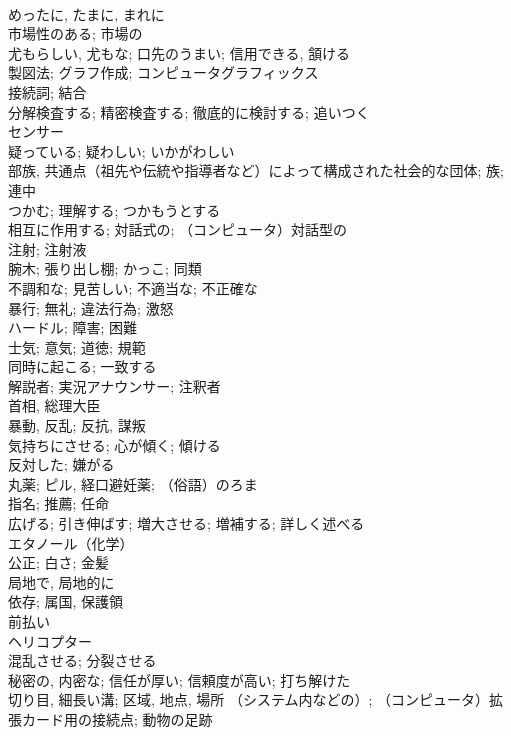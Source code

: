 \documentclass[8pt]{extreport}
\begin{document}
\begin{CJK}{UTF8}{min}
\\	めったに, たまに, まれに	
\\	市場性のある; 市場の	
\\	尤もらしい, 尤もな; 口先のうまい; 信用できる, 頷ける	
\\	製図法; グラフ作成; コンピュータグラフィックス	
\\	接続詞; 結合	
\\	分解検査する; 精密検査する; 徹底的に検討する; 追いつく	
\\	センサー	
\\	疑っている; 疑わしい; いかがわしい	
\\	部族, 共通点（祖先や伝統や指導者など）によって構成された社会的な団体; 族; 連中	
\\	つかむ; 理解する; つかもうとする	
\\	相互に作用する; 対話式の; （コンピュータ）対話型の	
\\	注射; 注射液	
\\	腕木; 張り出し棚; かっこ; 同類	
\\	不調和な; 見苦しい; 不適当な; 不正確な	
\\	暴行; 無礼; 違法行為; 激怒	
\\	ハードル; 障害; 困難	
\\	士気; 意気; 道徳; 規範	
\\	同時に起こる; 一致する	
\\	解説者; 実況アナウンサー; 注釈者
\\	首相, 総理大臣	
\\	暴動, 反乱; 反抗, 謀叛	
\\	気持ちにさせる; 心が傾く; 傾ける	
\\	反対した; 嫌がる	
\\	丸薬; ピル, 経口避妊薬; （俗語）のろま	
\\	指名; 推薦; 任命	
\\	広げる; 引き伸ばす; 増大させる; 増補する; 詳しく述べる	
\\	エタノール（化学）	
\\	公正; 白さ; 金髪	
\\	局地で, 局地的に	
\\	依存; 属国, 保護領	
\\	前払い	
\\	ヘリコプター	
\\	混乱させる; 分裂させる	
\\	秘密の, 内密な; 信任が厚い; 信頼度が高い; 打ち解けた	
\\	切り目, 細長い溝; 区域, 地点, 場所 （システム内などの）; （コンピュータ）拡張カード用の接続点; 動物の足跡	

\end{CJK}
\end{document}
